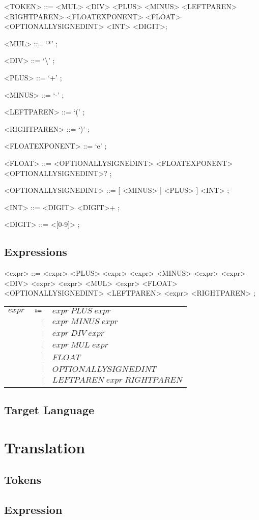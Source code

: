 \documentclass[a4paper,12pt]{article}
\begin{document}
\begin{grammar}
<TOKEN> ::= <MUL> <DIV> <PLUS> <MINUS> <LEFTPAREN> <RIGHTPAREN> <FLOATEXPONENT> <FLOAT> <OPTIONALLYSIGNEDINT> <INT> <DIGIT>;

<MUL> ::= `*' ;

<DIV> ::= `\textbackslash' ;

<PLUS> ::= `+' ;

<MINUS> ::= `-' ;

<LEFTPAREN> ::= `(' ;

<RIGHTPAREN> ::= `)' ;

<FLOATEXPONENT> ::= `e' ;

<FLOAT> ::= <OPTIONALLYSIGNEDINT> <FLOATEXPONENT> <OPTIONALLYSIGNEDINT>? ;

<OPTIONALLYSIGNEDINT> ::= [ <MINUS> | <PLUS> ] <INT> ;

<INT> ::= <DIGIT> <DIGIT>+ ;

<DIGIT> ::= <[0-9]> ;


\end{grammar}
\subsection{Expressions}

\begin{grammar}
<expr> ::= <expr> <PLUS> <expr> 
 \alt <expr> <MINUS> <expr> 
 \alt <expr> <DIV> <expr> 
 \alt <expr> <MUL> <expr> 
 \alt <FLOAT> 
 \alt <OPTIONALLYSIGNEDINT> 
 \alt <LEFTPAREN> <expr> <RIGHTPAREN> ;
 

\end{grammar}

{\setlength\tabcolsep{4pt}
\begin{tabular}{>{$}l<{$}>{$}r<{$}>{$}l<{$}}
  expr &\Coloneqq & expr \; PLUS \; expr\\
  &| &expr \; MINUS \; expr\\%
  &| &expr \; DIV \; expr\\%
  &| &expr \; MUL \; expr\\%
  &| &FLOAT\\%
  &| &OPTIONALLYSIGNEDINT\\%
  &| &LEFTPAREN \; expr \; RIGHTPAREN\\%
\end{tabular}}
\subsection{Target Language}
\section{Translation}
\subsection{Tokens}
\subsection{Expression}
\end{document}
